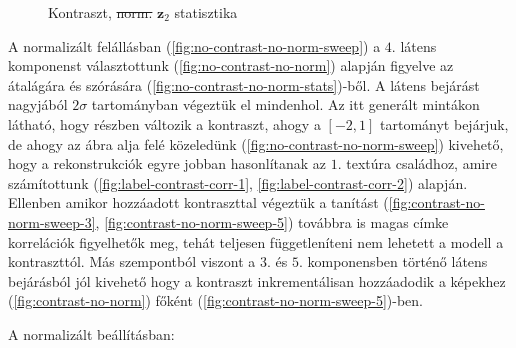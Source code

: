 \documentclass[12pt, english]{article}
\begin{document}
\begin{figure}[H]
\begin{minipage}{0.5\linewidth}
    \caption{Kontraszt, \st{norm.} \newline $\bm{z}_{2}$ statisztika} 
    \label{fig:contrast-no-norm-stats}
  \end{minipage}
\end{figure}

\vspace{4mm}

\par A normalizált felállásban (\ref{fig:no-contrast-no-norm-sweep}) a $4.$ látens komponenst választottunk (\ref{fig:no-contrast-no-norm}) alapján figyelve az átalágára és szórására (\ref{fig:no-contrast-no-norm-stats})-ből. A látens bejárást nagyjából $2\sigma$ tartományban végeztük el mindenhol. Az itt generált mintákon látható, hogy részben változik a kontraszt, ahogy a $[-2, 1]$ tartományt bejárjuk, de ahogy az ábra alja felé közeledünk (\ref{fig:no-contrast-no-norm-sweep}) kivehető, hogy a rekonstrukciók egyre jobban hasonlítanak az $1.$ textúra családhoz, amire számítottunk (\ref{fig:label-contrast-corr-1}, \ref{fig:label-contrast-corr-2}) alapján. Ellenben amikor hozzáadott kontraszttal végeztük a tanítást (\ref{fig:contrast-no-norm-sweep-3}, \ref{fig:contrast-no-norm-sweep-5}) továbbra is magas címke korrelációk figyelhetők meg, tehát teljesen függetleníteni nem lehetett a modell a kontraszttól. Más szempontból viszont a $3.$ és $5.$ komponensben történő látens bejárásból jól kivehető hogy a kontraszt inkrementálisan hozzáadodik a képekhez (\ref{fig:contrast-no-norm}) főként (\ref{fig:contrast-no-norm-sweep-5})-ben.

\vspace{4mm}

\par A normalizált beállításban:

\vspace{4mm}
\end{document}
